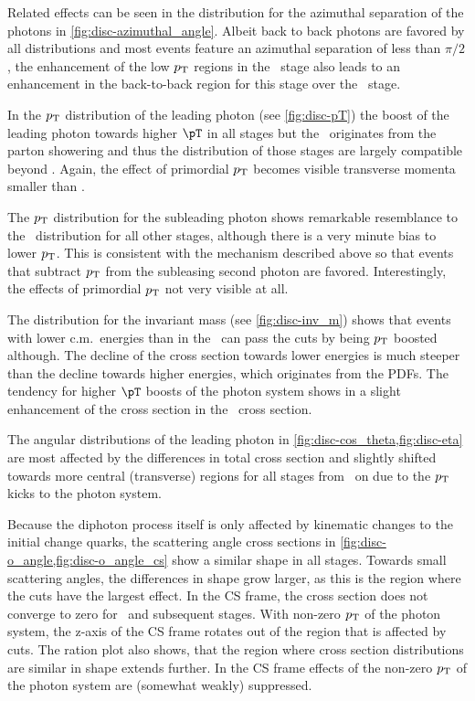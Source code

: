 Related effects can be seen in the distribution for the azimuthal
separation of the photons in \cref{fig:disc-azimuthal_angle}. Albeit
back to back photons are favored by all distributions and most events
feature an azimuthal separation of less than \(\pi/2\), the
enhancement of the low \(p_\mathrm{T}\) regions in the \stthree\ stage also
leads to an enhancement in the back-to-back region for this stage over
the \stone\ stage.

In the \(p_\mathrm{T}\) distribution of the leading photon (see
\cref{fig:disc-pT}) the boost of the leading photon towards higher
\(\pT\) in all stages but the \stone\ originates from the parton
showering and thus the distribution of those stages are largely
compatible beyond . Again, the effect of primordial \(p_\mathrm{T}\)
becomes visible transverse momenta smaller than .

The \(p_\mathrm{T}\) distribution for the subleading photon shows remarkable
resemblance to the \stone\ distribution for all other stages, although
there is a very minute bias to lower \(p_\mathrm{T}\). This is consistent with
the mechanism described above so that events that subtract \(p_\mathrm{T}\)
from the subleasing second photon are favored. Interestingly, the
effects of primordial \(p_\mathrm{T}\) not very visible at all.

The distribution for the invariant mass (see \cref{fig:disc-inv_m})
shows that events with lower c.m.\ energies than in the \stone\ can
pass the cuts by being \(p_\mathrm{T}\) boosted although. The decline of the
cross section towards lower energies is much steeper than the decline
towards higher energies, which originates from the PDFs. The tendency
for higher \(\pT\) boosts of the photon system shows in a slight
enhancement of the \sttwo cross section in the \sttwo\ cross section.

The angular distributions of the leading photon in
\cref{fig:disc-cos_theta,fig:disc-eta} are most affected by the
differences in total cross section and slightly shifted towards more
central (transverse) regions for all stages from \sttwo\ on due to the
\(p_\mathrm{T}\) kicks to the photon system.

Because the diphoton process itself is only affected by kinematic
changes to the initial change quarks, the scattering angle cross
sections in \cref{fig:disc-o_angle,fig:disc-o_angle_cs} show a similar
shape in all stages. Towards small scattering angles, the differences
in shape grow larger, as this is the region where the cuts have the
largest effect. In the CS frame, the cross section does not converge
to zero for \sttwo\ and subsequent stages. With non-zero \(p_\mathrm{T}\) of
the photon system, the z-axis of the CS frame rotates out of the
region that is affected by cuts. The ration plot also shows, that the
region where cross section distributions are similar in shape extends
further. In the CS frame effects of the non-zero \(p_\mathrm{T}\) of the photon
system are (somewhat weakly) suppressed.


